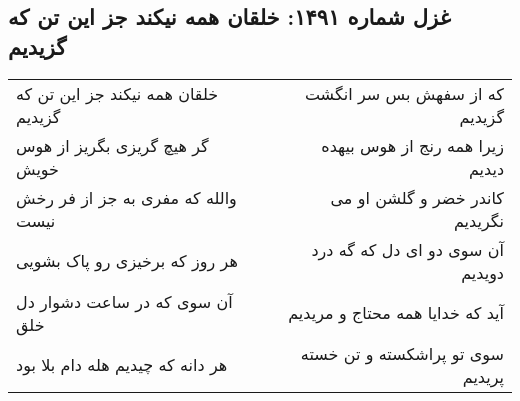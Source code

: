 \begin{center}
\section*{غزل شماره ۱۴۹۱: خلقان همه نیکند جز این تن که گزیدیم}
\label{sec:1491}
\begin{longtable}{l p{0.5cm} r}
خلقان همه نیکند جز این تن که گزیدیم
&&
که از سفهش بس سر انگشت گزیدیم
\\
گر هیچ گریزی بگریز از هوس خویش
&&
زیرا همه رنج از هوس بیهده دیدیم
\\
والله که مفری به جز از فر رخش نیست
&&
کاندر خضر و گلشن او می نگریدیم
\\
هر روز که برخیزی رو پاک بشویی
&&
آن سوی دو ای دل که گه درد دویدیم
\\
آن سوی که در ساعت دشوار دل خلق
&&
آید که خدایا همه محتاج و مریدیم
\\
هر دانه که چیدیم هله دام بلا بود
&&
سوی تو پراشکسته و تن خسته پریدیم
\\
\end{longtable}
\end{center}
